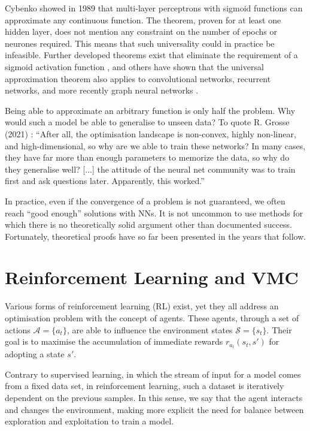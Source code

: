 Cybenko showed in 1989 \cite{cybenko1989approximation} that multi-layer perceptrons with sigmoid functions can approximate any continuous function. The theorem, proven for at least one hidden layer, does not mention any constraint on the number of epochs or neurones required. This means that such universality could in practice be infeasible. Further developed theorems exist that eliminate the requirement of a sigmoid activation function \cite{can1991multilayer}, and others have shown that the universal approximation theorem also applies to convolutional networks, recurrent networks, and more recently graph neural networks \cite{zhou2020universality, schafer2006recurrent, bruel2020universal}.

Being able to approximate an arbitrary function is only half the problem. Why would such a model be able to generalise to unseen data? To quote R. Grosse (2021) \cite{grosse2021csc2541}: ``After all, the optimisation landscape is non-convex, highly non-linear, and high-dimensional, so why are we able to train these networks? In many cases, they have far more than enough parameters to memorize the data, so why do they generalise well? [...] the attitude of the neural net community was to train first and ask questions later. Apparently, this worked.''

In practice, even if the convergence of a problem is not guaranteed, we often reach ``good enough'' solutions with NNs. It is not uncommon to use methods for which there is no theoretically solid argument other than documented success. Fortunately, theoretical proofs have so far been presented in the years that follow.

\section{Reinforcement Learning and VMC}\label{sec:VMC_RL}

Various forms of reinforcement learning (RL) exist, yet they all address an optimisation problem with the concept of agents. These agents, through a set of actions $\mathcal{A} = \{a_t\}$, are able to influence the environment states $\mathcal{S} = \{s_t\}$. Their goal is to maximise the accumulation of immediate rewards $r_{a_{t}}(s_t, s')$ for adopting a state $s'$.

Contrary to supervised learning, in which the stream of input for a model comes from a fixed data set, in reinforcement learning, such a dataset is iteratively dependent on the previous samples. In this sense, we say that the agent interacts and changes the environment, making more explicit the need for balance between exploration and exploitation to train a model.

